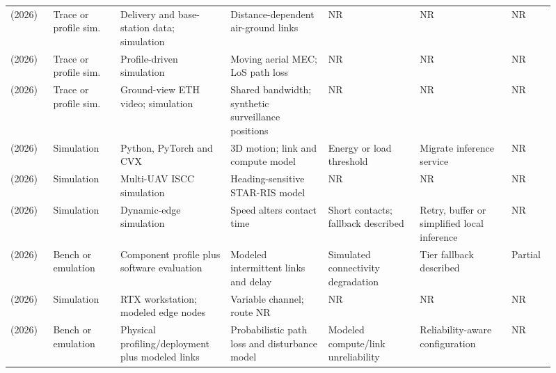 \begin{longtable}{@{}Y{0.075\linewidth}Y{0.116\linewidth}Y{0.17\linewidth}Y{0.163\linewidth}Y{0.156\linewidth}Y{0.153\linewidth}Y{0.077\linewidth}@{}}
\cite{R0001}\newline\mbox{(2026)} & Trace or profile sim. & Delivery and base-station data; simulation & Distance-dependent air-ground links & NR & NR & NR \\
\cite{R0009}\newline\mbox{(2026)} & Trace or profile sim. & Profile-driven simulation & Moving aerial MEC; LoS path loss & NR & NR & NR \\
\cite{R0036}\newline\mbox{(2026)} & Trace or profile sim. & Ground-view ETH video; simulation & Shared bandwidth; synthetic surveillance positions & NR & NR & NR \\
\cite{R0045}\newline\mbox{(2026)} & Simulation & Python, PyTorch and CVX & 3D motion; link and compute model & Energy or load threshold & Migrate inference service & NR \\
\cite{R0054}\newline\mbox{(2026)} & Simulation & Multi-UAV ISCC simulation & Heading-sensitive STAR-RIS model & NR & NR & NR \\
\cite{R0058}\newline\mbox{(2026)} & Simulation & Dynamic-edge simulation & Speed alters contact time & Short contacts; fallback described & Retry, buffer or simplified local inference & NR \\
\cite{R0063}\newline\mbox{(2026)} & Bench or emulation & Component profile plus software evaluation & Modeled intermittent links and delay & Simulated connectivity degradation & Tier fallback described & Partial \\
\cite{R0107}\newline\mbox{(2026)} & Simulation & RTX workstation; modeled edge nodes & Variable channel; route NR & NR & NR & NR \\
\cite{R0137}\newline\mbox{(2026)} & Bench or emulation & Physical profiling\allowbreak{}/deployment plus modeled links & Probabilistic path loss and disturbance model & Modeled compute\allowbreak{}/link unreliability & Reliability-aware configuration & NR \\
\end{longtable}\endgroup
